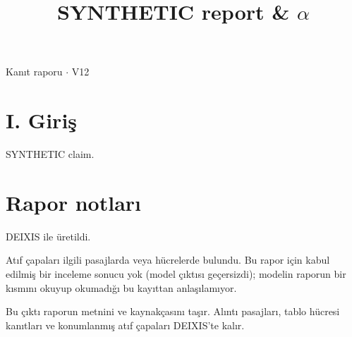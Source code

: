 \documentclass[journal]{IEEEtran}
\begin{document}
\renewcommand{\abstractname}{Özet}
\renewcommand{\IEEEkeywordsname}{Dizin Terimleri}
\renewcommand{\refname}{Kaynaklar}

\title{SYNTHETIC report \& \ensuremath{\alpha}}

\maketitle

\noindent Kanıt raporu \ensuremath{\cdot} V12

\section*{I. Giriş}

SYNTHETIC claim. \cite{Synth26}

\section*{Rapor notları}

DEIXIS ile üretildi.

Atıf çapaları ilgili pasajlarda veya hücrelerde bulundu. Bu rapor için kabul edilmiş bir inceleme sonucu yok (model çıktısı geçersizdi); modelin raporun bir kısmını okuyup okumadığı bu kayıttan anlaşılamıyor.

Bu çıktı raporun metnini ve kaynakçasını taşır. Alıntı pasajları, tablo hücresi kanıtları ve konumlanmış atıf çapaları DEIXIS'te kalır.




\end{document}
